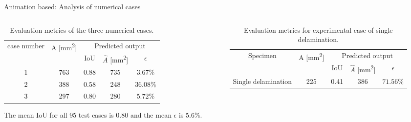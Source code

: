 \documentclass[10pt,aspectratio=169,dvipsnames]{beamer} %
\begin{document}
	\begin{frame}{Animation based: Analysis of numerical cases}		
		\begin{columns}[T]
			\tiny
			\begin{column}[t]{.5\textwidth}
				\begin{table}[!h]
					\centering
					\caption{Evaluation metrics of the three numerical cases.}
					\begin{tabular}{ccccc}
						\toprule[1.5pt]
						\multirow{2}{*}{case number} & \multicolumn{1}{c}{\multirow{2}{*}{A [mm\textsuperscript{2}]}} & \multicolumn{3}{c}{Predicted output} \\ 
						\cmidrule(lr){3-5} & & \multicolumn{1}{c}{IoU} & \multicolumn{1}{c}{\(\hat{A}\) [mm\textsuperscript{2}]} & \(\epsilon\) \\
						\midrule
						1 & 763 & \multicolumn{1}{c}{0.88} & \multicolumn{1}{c}{735} & \(3.67\%\) \\ 
						2 & 388 & \multicolumn{1}{c}{0.58} & \multicolumn{1}{c}{248} & \(36.08\%\) \\ 
						3 & 297 & \multicolumn{1}{c}{0.80} & \multicolumn{1}{c}{280} & \(5.72\%\) \\			 					
						\bottomrule[1.5pt]
					\end{tabular}	
					\label{tab:num_cases_}
				\end{table}
				\vfil
				\normalsize{The mean IoU for all 95 test cases is \(0.80\) and the mean \(\epsilon\) is \(5.6\%\).}
			\end{column}
			\begin{column}[t]{.5\textwidth}
				\begin{table}[!h]
					\centering
					\caption{Evaluation metrics for experimental case of single delamination.}
					\begin{tabular}{ccccc}
						\toprule[1.5pt]
						\multirow{2}{*}{Specimen} & \multicolumn{1}{c}{\multirow{2}{*}{A [mm\textsuperscript{2}]}} & \multicolumn{3}{c}{Predicted output} \\ 
						\cmidrule(lr){3-5} & & \multicolumn{1}{c}{IoU} & \multicolumn{1}{c}{\(\hat{A}\) [mm\textsuperscript{2}]} & \(\epsilon\) \\
						\midrule
						Single delamination & 225 & \multicolumn{1}{c}{0.41} &  \multicolumn{1}{c}{386} & \(71.56\%\) \\ 
						\bottomrule[1.5pt]										
					\end{tabular}
				\end{table}
				\begin{table}[!h]

\end{table}
\end{column}
\end{columns}
\end{frame}
\end{document}
